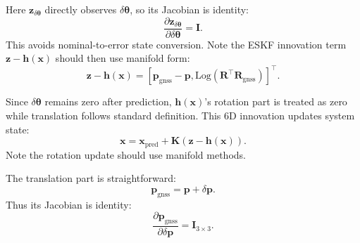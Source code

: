 Here $\mathbf{z}_{\delta \boldsymbol{\theta}}$ directly observes $\delta \boldsymbol{\theta}$, so its Jacobian is identity:
\begin{equation}\label{eq:error-jacobian}
\frac{\partial \mathbf{z}_{\delta \boldsymbol{\theta}}}{\partial \delta \boldsymbol{\theta}} = \mathbf{I}.
\end{equation}
This avoids nominal-to-error state conversion. Note the ESKF innovation term $\mathbf{z}-\mathbf{h}(\mathbf{x})$ should then use manifold form:
\begin{equation}\label{eq:manifold-innovation}
\mathbf{z} - \mathbf{h}(\mathbf{x}) = [\mathbf{p}_{\mathrm{gnss}} - \mathbf{p}, 
\mathrm{Log}(\mathbf{R}^\top \mathbf{R}_{\mathrm{gnss}})]^\top.
\end{equation}

Since $\delta \boldsymbol{\theta}$ remains zero after prediction, $\mathbf{h} (\mathbf{x})$'s rotation part is treated as zero while translation follows standard definition. This 6D innovation updates system state:
\begin{equation}\label{eq:state-update}
\mathbf{x} = \mathbf{x}_{\text{pred}} + \mathbf{K} (\mathbf{z} - \mathbf{h}(\mathbf{x})).
\end{equation}
Note the rotation update should use manifold methods.

The translation part is straightforward:
\begin{equation}\label{eq:translation-update}
\mathbf{p}_{\mathrm{gnss}} = \mathbf{p} + \delta \mathbf{p}.
\end{equation}
Thus its Jacobian is identity:
\begin{equation}\label{eq:trans-jacobian}
\frac{\partial \mathbf{p}_{\mathrm{gnss}}}{\partial \delta \mathbf{p}} = \mathbf{I}_{3 \times 3}.
\end{equation}

